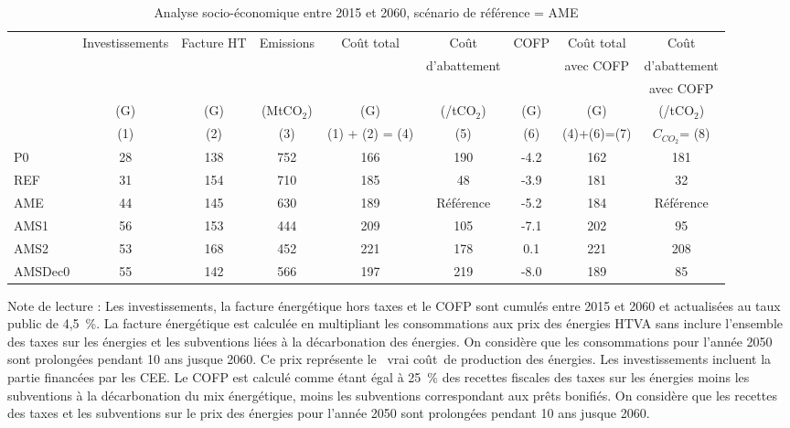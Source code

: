\documentclass[10.5pt,a4paper]{article}
\def\euro{\mbox{\raisebox{.25ex}{{\it =}}\hspace{-.5em}{\sf C}}}
\begin{document}
{\begin{table}[h] \caption{Analyse socio-économique entre 2015 et 2060, scénario de référence  = AME}\label{Bilan_socio} 
\begin{center}
\scriptsize
\begin{tabular}[c]{|l|c|c|c|c|c|c|c|c|}
\hline
			& Investissements	& Facture HT & Emissions	& Coût total  &	Coût 						& COFP	&Coût total	& Coût 					 \\
			&									&						 & 						&							&	d'abattement		&				&avec COFP	& d'abattement 	 \\	
			&									&						 &						&							&					&				&						&	avec COFP 				\\
			&		(G\euro)			&		(G\euro) &	(MtCO$_2$)&	(G\euro)		&	(\euro/tCO$_2$)	&	(G\euro) & (G\euro) & 	(\euro/tCO$_2$)	 \\
			&   (1) 					&    (2) 		 &   (3) 			&  (1) + (2) = (4)  &  		(5)			& 	(6)		&    (4)+(6)=(7)       &      $C_{CO_2}$= (8)          \\
\hline
P0		&		28 &138 &752 &166 &190 &-4.2 &162 &181 \\

REF		&		31 &154 &710 &185 &48 &-3.9 &181 &32 \\

AME		&		44 &145 &630 &189 & Référence &-5.2 &184 & Référence  \\

AMS1	&		56 &153 &444 &209 &105 &-7.1 &202 &95 \\

AMS2	&		53 &168 &452 &221 &178 &0.1 &221 &208 \\

AMSDec0	&	55 &142 &566 &197 &219 &-8.0 &189 &85\\
\hline
\end{tabular}
\end{center}
\footnotesize{Note de lecture : Les investissements, la facture énergétique hors taxes  et le COFP sont cumulés entre 2015 et 2060 et actualisées au taux public de 4,5~\%.  La facture énergétique est calculée en multipliant les consommations aux prix des énergies HTVA  sans inclure l'ensemble des taxes sur les énergies et les subventions liées à la décarbonation des énergies. On considère que les consommations pour l'année 2050 sont prolongées pendant 10 ans jusque 2060. Ce prix représente le \og~vrai coût~\fg de production des énergies. Les investissements incluent la partie financées par les CEE. Le COFP est calculé comme étant égal à 25~\% des recettes fiscales des taxes sur les énergies moins les subventions à la décarbonation du mix énergétique, moins les subventions correspondant aux prêts bonifiés. On considère que les recettes des taxes et les subventions sur le prix des énergies pour l'année 2050 sont prolongées pendant 10 ans jusque 2060.}


\end{table}}
\end{document}
